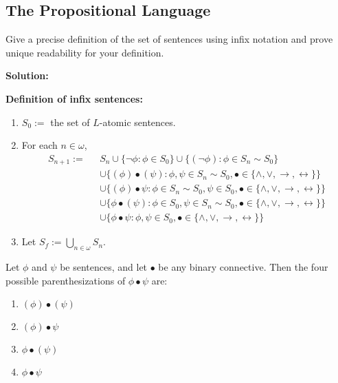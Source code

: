 \subsection{The Propositional Language}

\begin{tcolorbox}[title=Problem 10, breakable]
    Give a precise definition of the set of sentences using infix
    notation and prove unique readability for your definition.
\end{tcolorbox}

\textbf{Solution:}

\textbf{Definition of infix sentences:}
\begin{enumerate}
    \item $S_0 :=$ the set of $L$-atomic sentences.
    \item For each $n \in \omega$,
          \begin{align*}
            S_{n + 1} :=\text{ }&S_n \cup \{\neg \phi : \phi \in S_0\} 
                              \cup \{(\neg \phi) : \phi \in S_n \sim S_0\} \\
                         &\cup \{(\phi) \bullet (\psi): \phi, \psi \in S_n \sim S_0, \bullet \in \{\wedge, \vee, \rightarrow, \leftrightarrow\}\} \\
                         &\cup \{(\phi) \bullet \psi: \phi \in S_n \sim S_0, \psi \in S_0, \bullet \in \{\wedge, \vee, \rightarrow, \leftrightarrow\}\} \\
                         &\cup \{\phi \bullet (\psi): \phi \in S_0, \psi \in S_n \sim S_0, \bullet \in \{\wedge, \vee, \rightarrow, \leftrightarrow\}\} \\
                         &\cup \{\phi \bullet \psi: \phi, \psi \in S_0, \bullet \in \{\wedge, \vee, \rightarrow, \leftrightarrow\}\}
          \end{align*}
    \item Let $S_f := \bigcup_{n \in \omega} S_n$.
\end{enumerate}

\newpage
\begin{definition}\label{def:parenth}
Let $\phi$ and $\psi$ be sentences, and let $\bullet$ be any binary connective. Then the four possible parenthesizations of $\phi \bullet \psi$ are:
\begin{enumerate}
    \item $(\phi) \bullet (\psi)$
    \item $(\phi) \bullet \psi$
    \item $\phi \bullet (\psi)$
    \item $\phi \bullet \psi$
\end{enumerate}
\end{definition}

